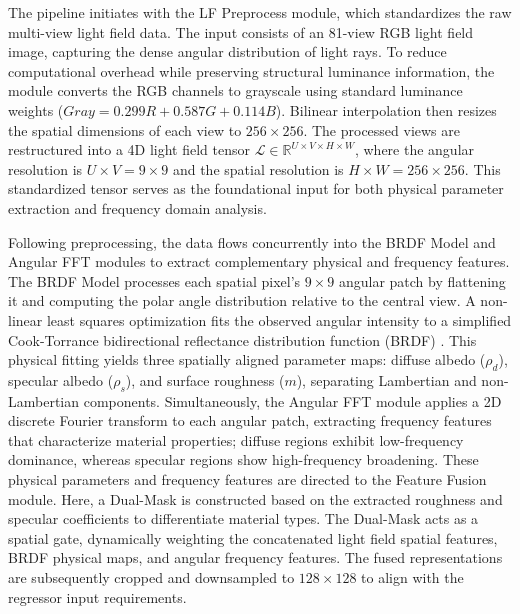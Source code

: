 \documentclass[lettersize,journal]{IEEEtran}
\begin{document}
The pipeline initiates with the LF Preprocess module, which standardizes the raw multi-view light field data. The input consists of an 81-view RGB light field image, capturing the dense angular distribution of light rays. To reduce computational overhead while preserving structural luminance information, the module converts the RGB channels to grayscale using standard luminance weights ($Gray = 0.299R + 0.587G + 0.114B$). Bilinear interpolation then resizes the spatial dimensions of each view to $256 \times 256$. The processed views are restructured into a 4D light field tensor $\mathcal{L} \in \mathbb{R}^{U \times V \times H \times W}$, where the angular resolution is $U \times V = 9 \times 9$ and the spatial resolution is $H \times W = 256 \times 256$. This standardized tensor serves as the foundational input for both physical parameter extraction and frequency domain analysis.

Following preprocessing, the data flows concurrently into the BRDF Model and Angular FFT modules to extract complementary physical and frequency features. The BRDF Model processes each spatial pixel's $9 \times 9$ angular patch by flattening it and computing the polar angle distribution relative to the central view. A non-linear least squares optimization fits the observed angular intensity to a simplified Cook-Torrance bidirectional reflectance distribution function (BRDF) \cite{blinn1977}. This physical fitting yields three spatially aligned parameter maps: diffuse albedo ($\rho_d$), specular albedo ($\rho_s$), and surface roughness ($m$), separating Lambertian and non-Lambertian components. Simultaneously, the Angular FFT module applies a 2D discrete Fourier transform to each angular patch, extracting frequency features that characterize material properties; diffuse regions exhibit low-frequency dominance, whereas specular regions show high-frequency broadening. These physical parameters and frequency features are directed to the Feature Fusion module. Here, a Dual-Mask is constructed based on the extracted roughness and specular coefficients to differentiate material types. The Dual-Mask acts as a spatial gate, dynamically weighting the concatenated light field spatial features, BRDF physical maps, and angular frequency features. The fused representations are subsequently cropped and downsampled to $128 \times 128$ to align with the regressor input requirements.
\end{document}
